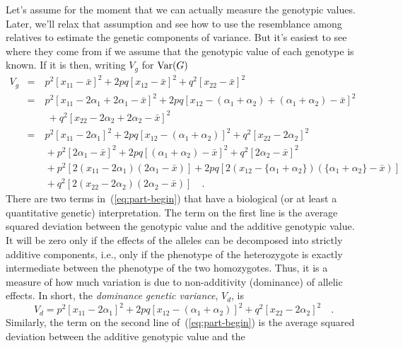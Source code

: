 \documentclass[12pt]{article}
\begin{document}
Let's assume for the moment that we can actually measure the genotypic
values. Later, we'll relax that assumption and see how to use the
resemblance among relatives to estimate the genetic components of
variance. But it's easiest to see where they come from if we assume
that the genotypic value of each genotype is known. If it is then,
writing $V_g$ for $\mbox{Var}(G)$
\begin{eqnarray}
V_g &=&\ p^2[x_{11} - {\bar x}]^2 + 2pq[x_{12} - {\bar x}]^2
     + q^2[x_{22} - {\bar x}]^2 \label{eq:v-g} \\
    &=&\ p^2[x_{11} - 2\alpha_1 + 2\alpha_1 - {\bar x}]^2
     + 2pq[x_{12} - (\alpha_1 + \alpha_2) + (\alpha_1 + \alpha_2)
                - {\bar x}]^2 \nonumber \\
     &&\ \ + q^2[x_{22} - 2\alpha_2 + 2\alpha_2 - {\bar x}]^2
     \nonumber \\
    &=&\ p^2[x_{11} - 2\alpha_1]^2 + 2pq[x_{12} - (\alpha_1+\alpha_2)]^2
       + q^2[x_{22} - 2\alpha_2]^2 \nonumber \\
     &&\ + p^2[2\alpha_1 - {\bar x}]^2 + 2pq[(\alpha_1 + \alpha_2) - {\bar x}]^2
       + q^2[2\alpha_2 - {\bar x}]^2 \nonumber \\
     &&\ + p^2[2(x_{11} - 2\alpha_1)(2\alpha_1 - {\bar x})]
       +2pq[2(x_{12} - \{\alpha_1+\alpha_2\})(\{\alpha_1+\alpha_2\} -
     {\bar x})] \nonumber \\
     &&\ +q^2[2(x_{22} - 2\alpha_2)(2\alpha_2 - {\bar x})] \quad .
     \label{eq:part-begin}
\end{eqnarray}
There are two terms in~(\ref{eq:part-begin}) that have a biological
(or at least a quantitative genetic) interpretation.  The term on the
first line is the average squared deviation between the genotypic
value and the additive genotypic value.  It will be zero only if the
effects of the alleles can be decomposed into strictly additive
components, i.e., only if the phenotype of the heterozygote is exactly
intermediate between the phenotype of the two homozygotes.  Thus, it
is a measure of how much variation is due to non-additivity
(dominance) of allelic effects.  In short, the {\it dominance genetic
variance}, $V_d$, is
\begin{equation}
V_d = p^2[x_{11} - 2\alpha_1]^2 + 2pq[x_{12} - (\alpha_1+\alpha_2)]^2
          + q^2[x_{22} - 2\alpha_2]^2 \quad .\label{eq:v-d}
\end{equation}
Similarly, the term on the second line of~(\ref{eq:part-begin}) is the
average squared deviation between the additive genotypic value and the
\end{document}
